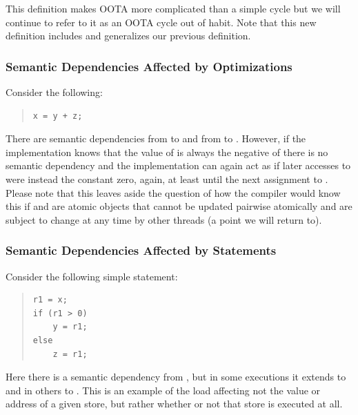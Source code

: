\documentclass[10]{article}
\begin{document}
This definition makes OOTA more complicated than a simple cycle but
we will continue to refer to it as an OOTA cycle out of habit.
Note that this new definition includes and generalizes our previous
 definition.

\subsubsection{Semantic Dependencies Affected by Optimizations}
\label{sec:Semantic Dependencies Affected by Optimizations}

Consider the following:

\begin{quote}
\begin{verbatim}
x = y + z;
\end{verbatim}
\end{quote}

There are semantic dependencies from  to  and from 
to .
However, if the implementation knows that the value of  is
always the negative of  there is no semantic dependency and the
implementation can again act as if later accesses to  were instead
the constant zero, again, at least until the next assignment to .
Please note that this leaves aside the question of how the compiler
would know this if  and  are atomic objects that cannot be
updated pairwise atomically and are subject to change at any time by
other threads (a point we will return to).

\subsubsection{Semantic Dependencies Affected by  Statements}
\label{sec:Semantic Dependencies Affected by if Statements}

Consider the following simple  statement:

\begin{quote}
\begin{verbatim}
r1 = x;
if (r1 > 0)
    y = r1;
else
    z = r1;
\end{verbatim}
\end{quote}

Here there is a semantic dependency from , but in some executions
it extends to  and in others to .
This is an example of the load affecting not the value or address of
a given store, but rather whether or not that store is executed at all.
\end{document}
